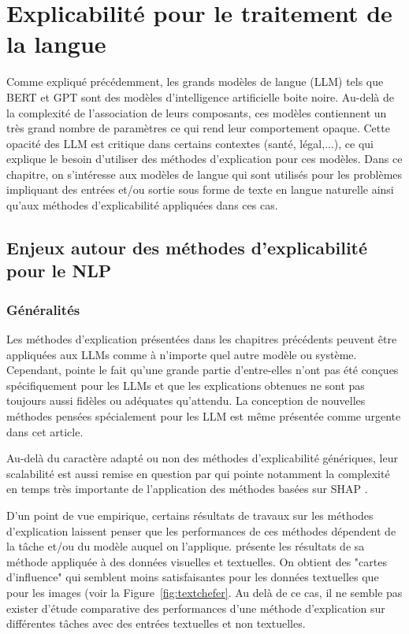 \documentclass{report}
\newcommand{\alh}[1]{\textcolor{teal}{#1}}
\begin{document}
 


\chapter{Explicabilité pour le traitement de la langue}

    Comme expliqué précédemment, les grands modèles de langue (LLM) tels que BERT et GPT sont des modèles d'intelligence artificielle boite noire. Au-delà de la complexité de l'association de leurs composants, ces modèles contiennent un très grand nombre de paramètres ce qui rend leur comportement opaque. Cette opacité des LLM est critique dans certains contextes (santé, légal,...), ce qui explique le besoin d'utiliser des méthodes d'explication pour ces modèles. Dans ce chapitre, on s'intéresse aux modèles de langue qui sont utilisés pour les problèmes impliquant des entrées et/ou sortie sous forme de texte en langue naturelle ainsi qu'aux méthodes d'explicabilité appliquées dans ces cas.
    
    \section{Enjeux autour des méthodes d'explicabilité pour le NLP}
        \subsection{Généralités}
        Les méthodes d'explication présentées dans les chapitres précédents peuvent être appliquées aux LLMs comme à n'importe quel autre modèle ou système. Cependant, \cite{mersha_evaluating_2025} pointe le fait qu'une grande partie d'entre-elles n'ont pas été conçues spécifiquement pour les LLMs et que les explications obtenues ne sont pas toujours aussi fidèles ou adéquates qu'attendu.
        La conception de nouvelles méthodes pensées spécialement pour les LLM est même présentée comme urgente dans cet article. 
        
        Au-delà du caractère adapté ou non des méthodes d'explicabilité génériques, leur scalabilité est aussi remise en question par \cite{garouani_investigating_2024} qui pointe notamment la complexité en temps très importante de l'application des méthodes basées sur SHAP \cite{marzouk_tractability_2024}. 
        
        D'un point de vue empirique, certains résultats de travaux sur les méthodes d'explication laissent penser que les performances de ces méthodes dépendent de la tâche et/ou du modèle auquel on l'applique. \cite{chefer_transformer_2021} présente les résultats de sa méthode appliquée à des données visuelles et textuelles. On obtient des "cartes d'influence" qui semblent moins satisfaisantes pour les données textuelles que pour les images (voir la Figure~\ref{fig:textchefer}. Au delà de ce cas, il ne semble pas exister d'étude comparative des performances d'une méthode d'explication sur différentes tâches avec des entrées textuelles et non textuelles. 
        
\end{document}
